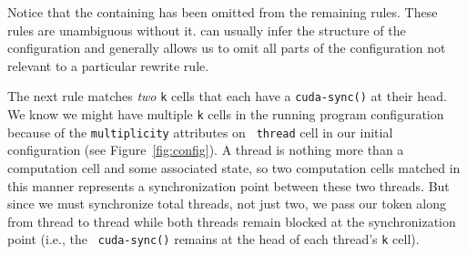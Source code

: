 \vspace{0.5em}
{\footnotesize







}

Notice that the containing  has been
omitted from the remaining rules. These rules are unambiguous without it. \K can
usually infer the structure of the configuration and generally allows us to omit
all parts of the configuration not relevant to a particular rewrite rule.

The next rule matches {\em two} {\tt k} cells that each have a {\tt cuda-sync()}
at their head. We know we might have multiple {\tt k} cells in the running
program configuration because of the {\tt multiplicity} attributes on {\tt
thread} cell in our initial configuration (see Figure~\ref{fig:config}). A
thread is nothing more than a computation cell and some associated state, so two
computation cells matched in this manner represents a synchronization point
between these two threads. But since we must synchronize  total threads,
not just two, we pass our token along from thread  to thread 
while both threads remain blocked at the synchronization point (i.e., the {\tt
cuda-sync()} remains at the head of each thread's {\tt k} cell).

